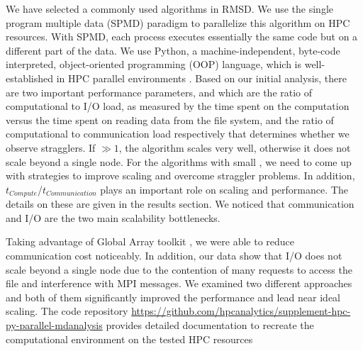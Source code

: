 We have selected a commonly used algorithms in  RMSD.
We use the single program multiple data (SPMD) paradigm to parallelize this algorithm on HPC resources.
With SPMD, each process executes essentially the same code but on a different part of the data. 
We use Python, a machine-independent, byte-code interpreted, object-oriented programming (OOP) language, which is well-established in HPC parallel environments \cite{GAiN}. 
Based on our initial analysis, there are two important performance parameters,  and  which are the ratio of computational to I/O load, as measured by the time spent on the computation versus the time spent on reading data from the file system, and the ratio of computational to communication load respectively that determines whether we observe stragglers.
If   $\gg 1$, the algorithm scales very well, otherwise it does not scale beyond a single node.  
For the algorithms with small , we need to come up with strategies to improve scaling and overcome straggler problems.
In addition, $t_{Compute}$/$t_{Communication}$ plays an important role on scaling and performance.   
The details on these are given in the results section. 
We noticed that communication and I/O are the two main scalability bottlenecks.

Taking advantage of Global Array toolkit \cite{GA, GAiN}, we were able to reduce communication cost noticeably.
In addition, our data show that I/O does not scale beyond a single node due to the contention of many requests to access the file and interference with MPI messages. 
We examined two different approaches and both of them significantly improved the performance and lead near ideal scaling.
The code repository \url{https://github.com/hpcanalytics/supplement-hpc-py-parallel-mdanalysis} provides detailed documentation to recreate the computational environment on the tested HPC resources